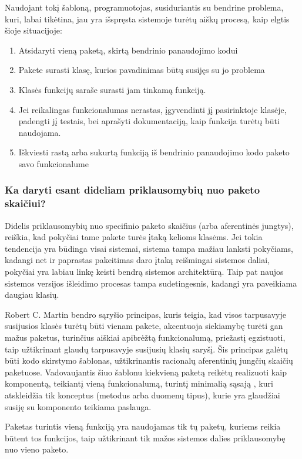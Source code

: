 Naudojant tokį šabloną, programuotojas, susiduriantis su bendrine problema, kuri, labai tikėtina, jau yra išspręsta sistemoje turėtų
aiškų procesą, kaip elgtis šioje situacijoje:
\begin{enumerate}
    \item Atsidaryti vieną paketą, skirtą bendrinio panaudojimo kodui
    \item Pakete surasti klasę, kurios pavadinimas būtų susijęs su jo problema
    \item Klasės funkcijų saraše surasti jam tinkamą funkciją.
    \item Jei reikalingas funkcionalumas nerastas, įgyvendinti jį pasirinktoje klasėje, padengti jį testais,
    bei aprašyti dokumentaciją, kaip funkcija turėtų būti naudojama.
    \item Iškviesti rastą arba sukurtą funkciją iš bendrinio panaudojimo kodo paketo savo funkcionalume
\end{enumerate}

\subsubsection{Ka daryti esant dideliam priklausomybių nuo paketo skaičiui?}
Didelis priklausomybių nuo specifinio paketo skaičius (arba aferentinės jungtys), reiškia, kad pokyčiai tame pakete turės įtaką kelioms klasėms.
Jei tokia tendencija yra būdinga visai sistemai, sistema tampa mažiau lanksti pokyčiams, kadangi net ir paprastas pakeitimas
daro įtaką reišmingai sistemos daliai, pokyčiai yra labiau linkę keisti bendrą sistemos architektūrą.
Taip pat naujos sistemos versijos išleidimo  procesas tampa sudetingesnis, kadangi yra paveikiama daugiau klasių.

Robert C. Martin bendro sąryšio principas, kuris teigia, kad visos tarpusavyje susijusios klasės turėtų būti vienam pakete,
akcentuoja siekiamybę turėti gan mažus paketus, turinčius aiškiai apibrėžtą funkcionalumą, priežastį egzistuoti, taip užtikrinant
glaudų tarpusavyje susijusių klasių saryšį.
Šis principas galėtų būti kodo skirstymo šablonas, užtikrinantis racionalų aferentinių jungčių skaičių paketuose.
Vadovaujantis šiuo šablonu kiekvieną paketą reikėtų realizuoti kaip komponentą, teikiantį vieną funkcionalumą,
turintį minimalią sąsają , kuri atskleidžia tik konceptus (metodus arba duomenų tipus),
kurie yra glaudžiai susiję su komponento teikiama paslauga.

Paketas turintis vieną funkciją yra naudojamas tik tų paketų, kuriems reikia būtent tos funkcijos,
taip užtikrinant tik mažos sistemos dalies priklausomybę nuo vieno paketo.

